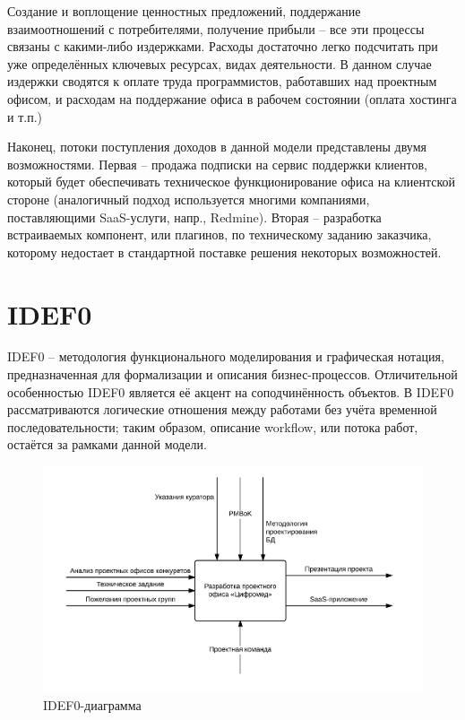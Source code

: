 \documentclass[14pt, a4paper]{extreport}
\begin{document}
Создание и воплощение ценностных предложений, поддержание взаимоотношений с потребителями, получение прибыли – все эти процессы связаны с какими-либо издержками. Расходы достаточно легко подсчитать при уже определённых ключевых ресурсах, видах деятельности. В данном случае издержки сводятся к оплате труда программистов, работавших над проектным офисом, и расходам на поддержание офиса в рабочем состоянии (оплата хостинга и т.п.)

Наконец, потоки поступления доходов в данной модели представлены двумя возможностями. Первая -- продажа подписки на сервис поддержки клиентов, который будет обеспечивать техническое функционирование офиса на клиентской стороне (аналогичный подход используется многими компаниями, поставляющими SaaS-услуги, напр., Redmine). Вторая -- разработка встраиваемых компонент, или плагинов, по техническому заданию заказчика, которому недостает в стандартной поставке решения некоторых возможностей.


\section{\MakeTextUppercase{IDEF0}}
IDEF0 -- методология функционального моделирования и графическая нотация, предназначенная для формализации и описания бизнес-процессов. Отличительной особенностью IDEF0 является её акцент на соподчинённость объектов. В IDEF0 рассматриваются логические отношения между работами без учёта временной последовательности; таким образом, описание workflow, или потока работ, остаётся за рамками данной модели.

\vspace{1em}

\begin{figure}[!htb]
  \centering
    \includegraphics[scale=0.35]{../shared_images/idef0.png}
   \caption{IDEF0-диаграмма}
    \label{fig:start}
\end{figure}
\end{document}
